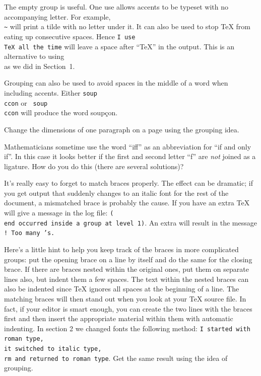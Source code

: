 The empty group {\tt\lb\rb} is useful.  One use allows accents to be 
typeset with no accompanying letter.  For example, {\tt \\\~{}\lb\rb} 
will print a tilde with no letter under it.  It can also be used to 
stop \TeX{} from eating up consecutive spaces. Hence {\tt I use 
\\TeX\lb\rb{} all the time}  will leave a space after ``\TeX'' in the 
output. This is an alternative to using {\tt \\\sp} as we did in 
Section~1. 

Grouping can also be used to avoid spaces in the middle of a word 
when including accents. Either {\tt soup\\c\sp con} or {\tt 
soup\\c\lb c\rb on} will produce the word soup\c{c}on. 

\exercise Change the dimensions of one paragraph on a page using the 
grouping idea. 

\exercise Mathematicians sometime use the word ``i{f}f'' as an 
abbreviation for ``if and only if''\null.  In this case it looks 
better if the first and second letter ``f'' are {\sl not\/} 
joined as a ligature.  How do you do this (there are several 
solutions)? 

It's really easy to forget to match braces properly.  The effect 
can be dramatic; if you get output that suddenly changes to an 
italic font for the rest of the document, a mismatched brace is 
probably the cause.  If you have an extra {\tt \lb} \TeX{} will 
give a message in the log file: {\tt (\\end occurred inside a 
group at level 1)}. An extra {\tt\rb} will result in the message 
\hbox{\tt! Too many \rb's.} 

Here's a little hint to help you keep track of the braces in more 
complicated groups: put the opening brace on a line by itself and 
do the same for the closing brace.  If there are braces nested 
within the original ones, put them on separate lines also, but 
indent them a few spaces.  The text within the nested braces can 
also be indented since \TeX{} ignores all spaces at the beginning 
of a line. The matching braces will then stand out when you look 
at your \TeX{} source file.  In fact, if your editor is smart 
enough, you can create the two lines with the braces first and 
then insert the appropriate material within them with automatic 
indenting. 
%
\exercise In section 2 we changed fonts the following method: 
{\tt I started with roman type, \\it switched to italic type, 
\\rm and returned to roman type}. Get the same result using the 
idea of grouping. 


